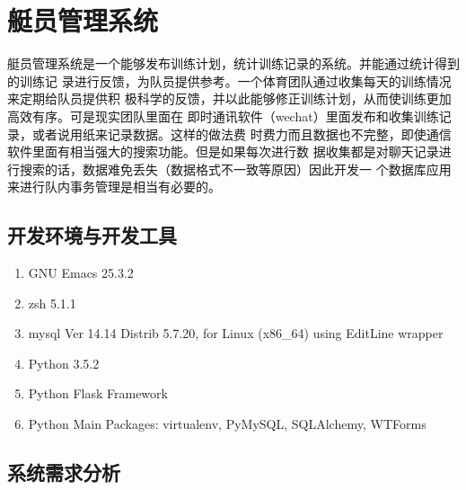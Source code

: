 \chapter{艇员管理系统}
艇员管理系统是一个能够发布训练计划，统计训练记录的系统。并能通过统计得到的训练记
录进行反馈，为队员提供参考。一个体育团队通过收集每天的训练情况来定期给队员提供积
极科学的反馈，并以此能够修正训练计划，从而使训练更加高效有序。可是现实团队里面在
即时通讯软件（wechat）里面发布和收集训练记录，或者说用纸来记录数据。这样的做法费
时费力而且数据也不完整，即使通信软件里面有相当强大的搜索功能。但是如果每次进行数
据收集都是对聊天记录进行搜索的话，数据难免丢失（数据格式不一致等原因）因此开发一
个数据库应用来进行队内事务管理是相当有必要的。

\newpage

\section{开发环境与开发工具}

\begin{enumerate}
\item {GNU Emacs 25.3.2}
\item {zsh 5.1.1}
\item {mysql  Ver 14.14 Distrib 5.7.20, for Linux (x86\_64) using  EditLine wrapper}
\item {Python 3.5.2}
\item {Python Flask Framework}
\item {Python Main Packages:
    virtualenv, PyMySQL, SQLAlchemy, WTForms}
\end{enumerate}


\section{系统需求分析}%
        
